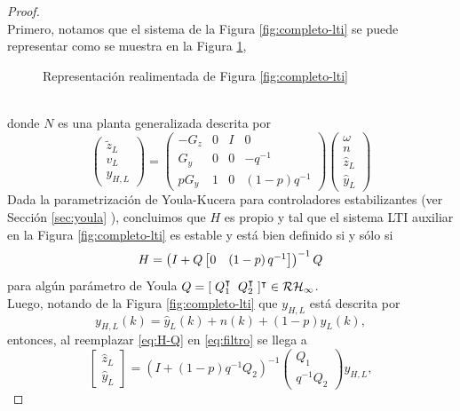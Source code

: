 \begin{proof}{\ \\}
Primero, notamos que el sistema de la Figura \ref{fig:completo-lti} se puede representar como se muestra en la Figura \ref{fig:fb-completo},
\begin{figure}[htbp]
\centering
\scalebox{0.8}{}
\caption{Representaci\'on realimentada de Figura \ref{fig:completo-lti}}
\label{fig:fb-completo}
\end{figure}
\\ \noindent
donde $N$ es una planta generalizada descrita por
\begin{equation}
\left(\begin{array}{ccc}\tilde{z}_L\\ v_L \\ \hline y_{H,L}\end{array}\right)=\left(\begin{array}{cc|cc}-G_{z}&0&I&0\\G_{y}&0&0&-q^{-1}\\ \hline pG_{y}&1&0&(1-p)q^{-1}\end{array}\right)\left(\begin{array}{cccc}\omega \\n\\ \hline \hat{z}_L\\ \hat{y}_L\end{array}\right)
\end{equation}
Dada la parametrizaci\'on de Youla-Kucera para controladores estabilizantes \cite{zhdogl96} (ver Secci\'on \ref{sec:youla} ), concluimos que $H$ es propio y tal que el sistema LTI auxiliar en la Figura \ref{fig:completo-lti} es estable y est\'a bien definido si y s\'olo si
\begin{equation}
H = \left( I + Q \matriz{ 0 & \left( 1-p\right) q^{-1} } \right)^{-1} Q
\end{equation}
para alg\'un par\'ametro de Youla $Q=[\; Q_1^{\intercal} \;\; Q_2^{\intercal} \;]^{\intercal} \in \cal{RH}_{\infty}$.
\\ \noindent
Luego, notando de la Figura \ref{fig:completo-lti} que $y_{H,L}$ est\'a descrita por
\begin{equation}\label{eq:y-h-l}
y_{H,L}(k) = \hat{y}_L(k)+n(k)+(1-p)\hat{y}_L(k),
\end{equation}
entonces, al reemplazar \eqref{eq:H-Q} en \eqref{eq:filtro} se llega a
\begin{equation}\label{eq:demoaux}
\left[\begin{array}{cc}\hat{z}_L\\ \hat{y}_L\end{array}\right] = \left(I + (1-p)q^{-1}Q_2\right)^{-1}\left(\begin{array}{cc}Q_1\\ q^{-1}Q_2\end{array}\right)y_{H,L},

\end{equation}
\end{proof}
